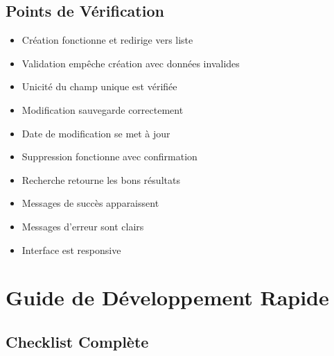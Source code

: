 \documentclass[12pt,a4paper]{article}
\begin{document}
\subsection{Points de Vérification}

\begin{itemize}
    \item[$\square$] Création fonctionne et redirige vers liste
    \item[$\square$] Validation empêche création avec données invalides
    \item[$\square$] Unicité du champ unique est vérifiée
    \item[$\square$] Modification sauvegarde correctement
    \item[$\square$] Date de modification se met à jour
    \item[$\square$] Suppression fonctionne avec confirmation
    \item[$\square$] Recherche retourne les bons résultats
    \item[$\square$] Messages de succès apparaissent
    \item[$\square$] Messages d'erreur sont clairs
    \item[$\square$] Interface est responsive
\end{itemize}

\newpage

\section{Guide de Développement Rapide}

\subsection{Checklist Complète}
\end{document}

